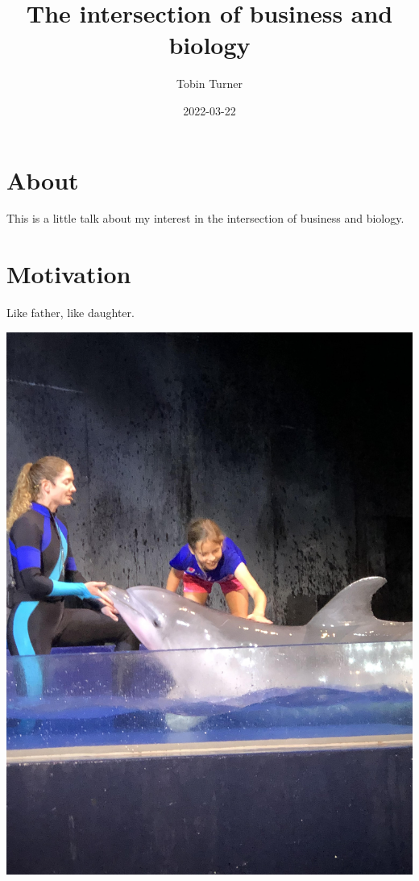 \documentclass[
]{book}
\title{The intersection of business and biology}
\author{Tobin Turner}
\date{2022-03-22}
\begin{document}
\maketitle

{
\setcounter{tocdepth}{1}
\tableofcontents
}
\hypertarget{about}{%
\chapter{About}\label{about}}

This is a little talk about my interest in the intersection of business and biology.

\hypertarget{motivation}{%
\chapter{Motivation}\label{motivation}}

Like father, like daughter.

\begin{center}\includegraphics{_images/meredith} \end{center}
\end{document}
